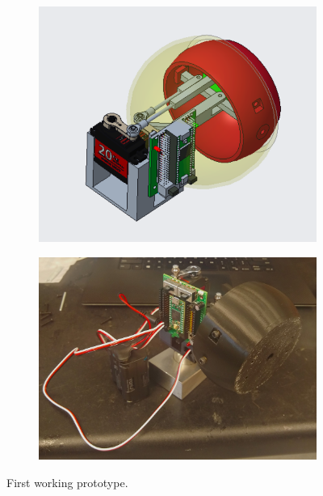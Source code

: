 \begin{figure}[h]
    \centering
    \begin{subfigure}{0.48\linewidth}
        \includegraphics[width=\textwidth]{Thesis/ch2/first-prototype.png}
    \end{subfigure}
    \hfill
    \begin{subfigure}{0.48\linewidth}
        \includegraphics[width=\textwidth]{Thesis/ch2/first-proto-cropped.jpg}
    \end{subfigure}
    
    \caption{First working prototype.}
    \label{fig:first-prototype}
\end{figure}

